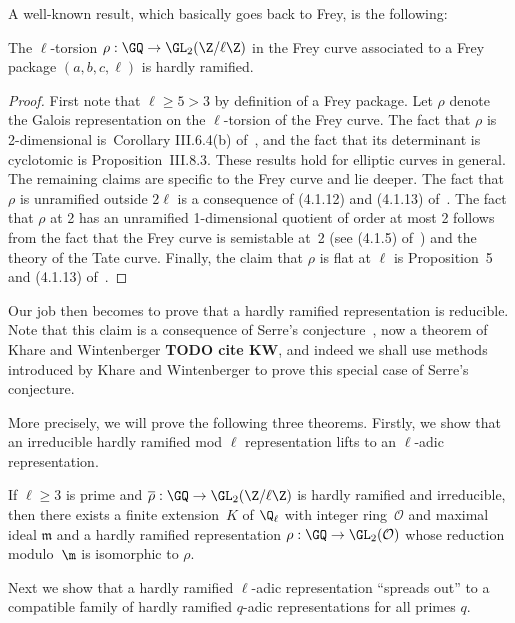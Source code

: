 A well-known result, which basically goes back to Frey, is the following:

\begin{theorem}
  \label{Frey_curve_hardly_ramified}
  The $\ell$-torsion $\rho:\GQ\to\GL_2(\Z/\ell\Z)$ in the Frey curve associated to a Frey
  package $(a,b,c,\ell)$ is hardly ramified.
\end{theorem}
\begin{proof}
  First note that $\ell\geq5>3$ by definition of a Frey package. Let $\rho$
  denote the Galois representation on the $\ell$-torsion of the Frey curve.
  The fact that $\rho$ is 2-dimensional is~Corollary
  III.6.4(b) of~\cite{silverman1}, and the fact that its determinant is
  cyclotomic is Proposition~III.8.3. These results hold for elliptic curves
  in general. The remaining claims are specific to the Frey curve and lie
  deeper. The fact that $\rho$ is unramified outside $2\ell$ is a consequence
  of (4.1.12) and (4.1.13) of~\cite{serreconj}. The fact that $\rho$ at 2
  has an unramified 1-dimensional quotient of order at most 2 follows from
  the fact that the Frey curve is semistable at~2 (see (4.1.5) of~\cite{serreconj})
  and the theory of the Tate curve. Finally, the claim that $\rho$ is flat at $\ell$
  is Proposition~5 and (4.1.13) of~\cite{serreconj}.
\end{proof}

Our job then becomes to prove that a hardly ramified representation is reducible.
Note that this claim is a consequence of Serre's conjecture~\cite{serreconj},
now a theorem of Khare and Wintenberger {\bf TODO cite KW}, and indeed we shall use
methods introduced by Khare and Wintenberger to prove this special case of
Serre's conjecture.

More precisely, we will prove the following three theorems. Firstly, we show that
an irreducible hardly ramified mod $\ell$ representation lifts to an $\ell$-adic representation.

\begin{theorem} If $\ell\geq3$ is prime and $\overline{\rho}:\GQ\to\GL_2(\Z/\ell\Z)$
  \label{hardly-ramified-lifts}
  is hardly ramified and irreducible, then there exists a finite extension~$K$ of $\Q_\ell$
  with integer ring~$\mathcal{O}$ and maximal ideal $\mathfrak{m}$
  and a hardly ramified representation
  $\rho:\GQ\to\GL_2(\mathcal{O})$ whose reduction modulo~$\m$ is isomorphic to $\rho$.
\end{theorem}

Next we show that a hardly ramified $\ell$-adic representation ``spreads out'' to a compatible
family of hardly ramified $q$-adic representations for all primes $q$.

